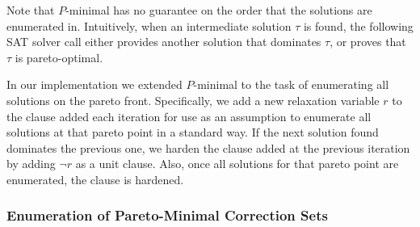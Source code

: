 Note that $P$-minimal has no guarantee on the order that the solutions are enumerated in. 
Intuitively, when an intermediate
solution $\tau$ is found, the following SAT solver call either provides another solution that dominates $\tau$, or proves that $\tau$ is pareto-optimal.  

In our implementation we extended $P$-minimal to the task of enumerating all solutions on the pareto front.
Specifically, we  add a new relaxation variable $r$ to the clause added each iteration for use as an assumption
to enumerate all solutions at that pareto point in a standard way.
If the next solution found dominates the previous one,
we harden the clause added at the previous iteration by adding $\lnot r$ as a unit clause.
Also,
once all solutions for that pareto point are enumerated, the clause is hardened.

\subsubsection{Enumeration of Pareto-Minimal Correction Sets\label{sec:pareto-mcs}}

